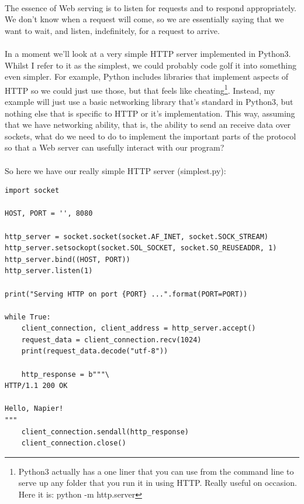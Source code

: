 \paragraph{} The essence of Web serving is to listen for requests and to respond appropriately. We don't know when a request will come, so we are essentially saying that we want to wait, and listen, indefinitely, for a request to arrive.

\paragraph{} In a moment we'll look at a very simple HTTP server implemented in Python3. Whilst I refer to it as the simplest, we could probably code golf it into something even simpler. For example, Python includes libraries that implement aspects of HTTP so we could just use those, but that feels like cheating\footnote{Python3 actually has a one liner that you can use from the command line to serve up any folder that you run it in using HTTP. Really useful on occasion. Here it is: python -m http.server}. Instead, my example will just use a basic networking library that's standard in Python3, but nothing else that is specific to HTTP or it's implementation. This way, assuming that we have networking ability, that is, the ability to send an receive data over sockets, what do we need to do to implement the important parts of the protocol so that a Web server can usefully interact with our program?

\paragraph{} So here we have our really simple HTTP server (simplest.py):

\begin{lstlisting}
import socket

HOST, PORT = '', 8080

http_server = socket.socket(socket.AF_INET, socket.SOCK_STREAM)
http_server.setsockopt(socket.SOL_SOCKET, socket.SO_REUSEADDR, 1)
http_server.bind((HOST, PORT))
http_server.listen(1)

print("Serving HTTP on port {PORT} ...".format(PORT=PORT))

while True:
    client_connection, client_address = http_server.accept()
    request_data = client_connection.recv(1024)
    print(request_data.decode("utf-8"))

    http_response = b"""\
HTTP/1.1 200 OK

Hello, Napier!
"""
    client_connection.sendall(http_response)
    client_connection.close()
\end{lstlisting}

